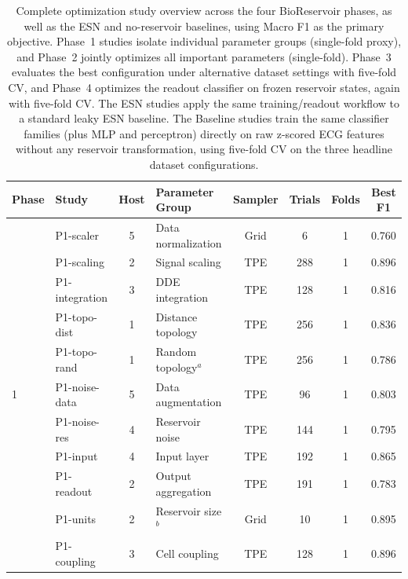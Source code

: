 \documentclass[journal=asbcd6,manuscript=suppinfo]{achemso}
\begin{document}
\begin{table}[H]
    \centering
    \caption{Complete optimization study overview across the four BioReservoir phases, as well as the ESN and no-reservoir baselines, using Macro F1 as the primary objective.
    Phase~1 studies isolate individual parameter groups (single-fold proxy), and Phase~2 jointly optimizes all important parameters (single-fold). 
    Phase~3 evaluates the best configuration under alternative dataset settings with five-fold CV, and 
    Phase~4 optimizes the readout classifier on frozen reservoir states, again with five-fold CV. 
    The ESN studies apply the same training/readout workflow to a standard leaky ESN baseline.
    The Baseline studies train the same classifier families (plus MLP and perceptron) directly on raw z-scored ECG features without any reservoir transformation, using five-fold CV on the three headline dataset configurations.}
    \label{tab:study-overview}
    \small
    \begin{tabular}{llclcccc}
        \toprule
        Phase & Study & Host & Parameter Group & Sampler & Trials & Folds & Best F1 \\
        \midrule
        \multirow{11}{*}{1}
        & P1-scaler        & 5 & Data normalization    & Grid & 6    & 1 & 0.760 \\
        & P1-scaling       & 2 & Signal scaling        & TPE  & 288  & 1 & 0.896 \\
        & P1-integration   & 3 & DDE integration       & TPE  & 128  & 1 & 0.816 \\
        & P1-topo-dist     & 1 & Distance topology     & TPE  & 256  & 1 & 0.836 \\
        & P1-topo-rand     & 1 & Random topology$^{a}$ & TPE  & 256  & 1 & 0.786 \\
        & P1-noise-data    & 5 & Data augmentation     & TPE  & 96   & 1 & 0.803 \\
        & P1-noise-res     & 4 & Reservoir noise       & TPE  & 144  & 1 & 0.795 \\
        & P1-input         & 4 & Input layer           & TPE  & 192  & 1 & 0.865 \\
        & P1-readout       & 2 & Output aggregation    & TPE  & 191  & 1 & 0.783 \\
        & P1-units         & 2 & Reservoir size$^{b}$  & Grid & 10   & 1 & 0.895 \\
        & P1-coupling      & 3 & Cell coupling         & TPE  & 128  & 1 & 0.896 \\
        \midrule

\end{tabular}
\end{table}
\end{document}
